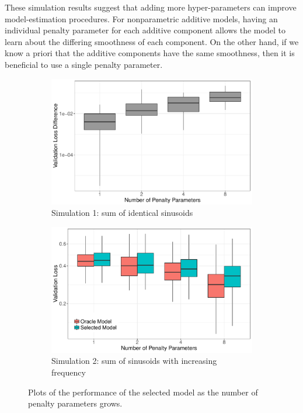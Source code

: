 \documentclass[12pt]{article}
\begin{document}
These simulation results suggest that adding more hyper-parameters can improve model-estimation procedures. For nonparametric additive models, having an individual penalty parameter for each additive component allows the model to learn about the differing smoothness of each component. On the other hand, if we know a priori that the additive components have the same smoothness, then it is beneficial to use a single penalty parameter.

\begin{figure}
	\centering
	\begin{subfigure}{0.75\textwidth}
	\includegraphics[width=\textwidth]{../../R/figures/validation_size_loss_diff_homogeneous.pdf}
	\caption{Simulation 1: sum of identical sinusoids}
	\end{subfigure}
	\begin{subfigure}{0.75\textwidth}
	\includegraphics[width=\textwidth]{../../R/figures/validation_size_loss_heterogeneous.pdf}
	\caption{Simulation 2: sum of sinusoids with increasing frequency}
	\end{subfigure}
	\caption{
		Plots of the performance of the selected model as the number of penalty parameters grows. 
	}
	\label{fig:simulations}
\end{figure}
\end{document}
